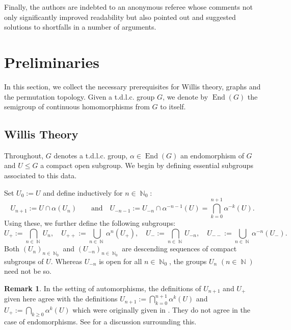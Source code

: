 \documentclass{article}
\DeclareMathOperator\End{End}
\DeclareMathOperator\bbN{\mathbb{N}}
\theoremstyle{definition}
\newtheorem{remark}[theorem]{Remark}
\begin{document}
Finally, the authors are indebted to an anonymous referee whose comments not only significantly improved readability but also pointed out and suggested solutions to shortfalls in a number of arguments.


\section{Preliminaries}\label{sec:preliminaries}

In this section, we collect the necessary prerequisites for Willis theory, graphs and the permutation topology. Given a t.d.l.c. group $G$, we denote by $\End(G)$ the semigroup of continuous homomorphisms from $G$ to itself.

\subsection{Willis Theory}\label{sec:Willis_theory}
Throughout, $G$ denotes a t.d.l.c. group, $\alpha\in\End(G)$ an endomorphism of $G$ and $U\le G$ a compact open subgroup. We begin by defining essential subgroups associated to this data.

Set $U_{0}:=U$ and define inductively for $n\in\bbN_{0}$:
\begin{displaymath}
U_{n+1}:=U\cap\alpha(U_{n})\quad \quad\text{and}\quad U_{-n-1}:=U_{-n}\cap\alpha^{-n-1}(U)=\bigcap_{k = 0}^{n+1}\alpha^{-k}(U).
\end{displaymath}
Using these, we further define the following subgroups:
\begin{displaymath}
 U_{+}:=\bigcap_{n\in \bbN}U_{n},\quad U_{++}:=\bigcup_{n\in\bbN}\alpha^{n}(U_{+}),\quad U_{-}:=\bigcap_{n\in \bbN}U_{-n},\quad U_{--}:=\bigcup_{n\in\bbN}\alpha^{-n}(U_{-}).
\end{displaymath}
Both $(U_{n})_{n\in\bbN_{0}}$ and $(U_{-n})_{n\in\bbN_{0}}$ are descending sequences of compact subgroups of $U$. Whereas $U_{-n}$
is open for all $n\in\bbN_{0}$, the groups $U_{n}$ $(n\in\bbN)$ need not be so.

\begin{remark}\label{rem:comparison_of_definitions}
In the setting of automorphisms, the definitions of $U_{n+1}$ and $U_{+}$ given here agree with the definitions $U_{n+1} := \bigcap_{k = 0}^{n+1}\alpha^k(U)$ and $U_{+} := \bigcap_{k\ge 0} \alpha^k(U)$ which were originally given in \cite{Wil94}. They do not agree in the case of endomorphisms. See \cite[Section 3]{Wil15} for a discussion surrounding this. 
\end{remark}
\end{document}
